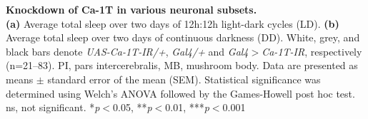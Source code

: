 \label{fig:6}
\textbf{Knockdown of Ca-\alpha1T in various neuronal subsets.}
\\
\textbf {(a)} Average total sleep over two days of 12h:12h light-dark cycles (LD).
\textbf {(b)} Average total sleep over two days of continuous darkness (DD).
White, grey, and black bars denote \emph{UAS-Ca-\alpha1T-IR/+}, \emph{Gal4/+} and \emph{Gal4$>$Ca-\alpha1T-IR}, respectively (n=21--83).
PI, pars intercerebralis, MB, mushroom body. 
Data are presented as means $\pm$ standard error of the mean (SEM).
Statistical significance was determined using Welch's ANOVA followed by the Games-Howell post hoc test.
ns, not significant.
*\emph{p}$<$0.05, **\emph{p}$<$0.01, ***\emph{p}$<$0.001
